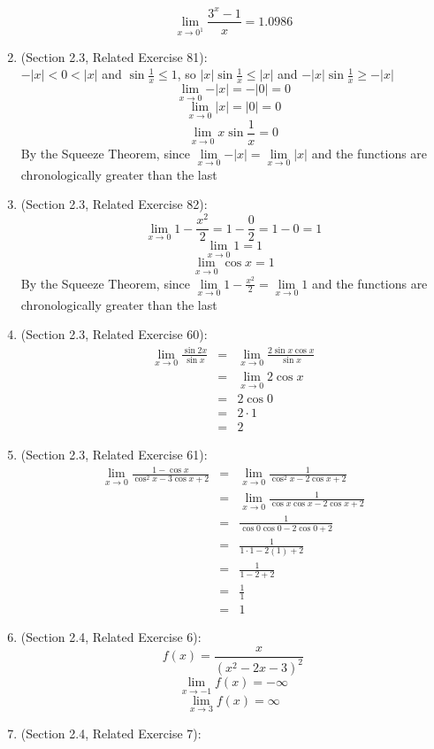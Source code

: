 \documentclass{article}
\begin{document}
\begin{enumerate}
		    $$\lim_{x \to 0^1}{\frac{3^x-1}{x}} = 1.0986$$
    \item (Section 2.3, Related Exercise 81):
	    \\ $-|x| < 0 < |x|$ and $\sin{\frac{1}{x}} \leq 1$, so $|x| \sin{\frac{1}{x}} \leq |x|$ and $-|x| \sin{\frac{1}{x}} \geq -|x|$
		$$\lim_{x \to 0}{-|x|} = -|0| = 0$$
		$$\lim_{x \to 0}{|x|} = |0| = 0$$
		$$\lim_{x \to 0}{x \sin{\frac{1}{x}}} = 0$$
		By the Squeeze Theorem, since $\lim\limits_{x \to 0}{-|x|} = \lim\limits_{x \to 0}{|x|}$ and the functions are chronologically greater than the last
    \item (Section 2.3, Related Exercise 82):
		$$\lim_{x \to 0}{1 - \frac{x^2}{2}} = 1 -\frac{0}{2} = 1 - 0 = 1$$
		$$\lim_{x \to 0}{1} = 1$$
		$$\lim_{x \to 0}{\cos{x}} = 1$$
		By the Squeeze Theorem, since $\lim\limits_{x \to 0}{1 - \frac{x^2}{2}} = \lim\limits_{x \to 0}{1}$ and the functions are chronologically greater than the last
    \item (Section 2.3, Related Exercise 60):
	    \begin{eqnarray}
	    \lim_{x \to 0}{\frac{\sin{2x}}{\sin{x}}} &=& \lim_{x \to 0}{\frac{2\sin{x}\cos{x}}{\sin{x}}} \\
	    &=& \lim_{x \to 0}{2 \cos{x}} \\
	    &=& 2 \cos{0} \\
	    &=& 2 \cdot 1 \\
	    &=& 2
	    \end{eqnarray}
    \item (Section 2.3, Related Exercise 61):
	    \begin{eqnarray}
	    \lim_{x \to 0}{\frac{1 - \cos{x}}{\cos^2{x} - 3 \cos{x} + 2}} &=& \lim_{x \to 0}{\frac{1}{\cos^2{x} - 2 \cos{x} + 2}} \\
	    &=& \lim_{x \to 0}{\frac{1}{\cos{x} \cos{x} - 2 \cos{x} + 2}} \\
	    &=& \frac{1}{\cos{0} \cos{0} - 2 \cos{0} + 2} \\
	    &=& \frac{1}{1 \cdot 1 - 2(1) + 2} \\
	    &=& \frac{1}{1 - 2 + 2} \\
	    &=& \frac{1}{1} \\
	    &=& 1
	    \end{eqnarray}
	\item (Section 2.4, Related Exercise 6):
		$$f(x) = \frac{x}{(x^2 - 2x - 3)^2}$$
		$$\lim_{x \to -1}{f(x)} = - \infty$$
		$$\lim_{x \to 3}{f(x)} = \infty$$
	\item (Section 2.4, Related Exercise 7):

\end{enumerate}
\end{document}
